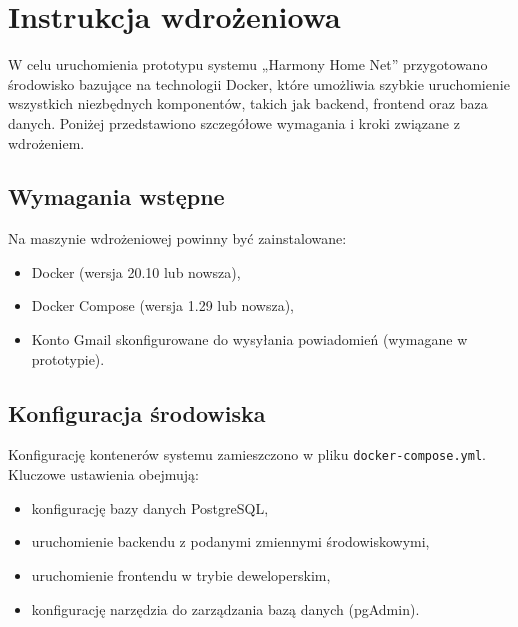 \chapter{Instrukcja wdrożeniowa}

W celu uruchomienia prototypu systemu „Harmony Home Net” przygotowano środowisko bazujące na technologii Docker, które umożliwia szybkie uruchomienie wszystkich niezbędnych komponentów, takich jak backend, frontend oraz baza danych. Poniżej przedstawiono szczegółowe wymagania i kroki związane z wdrożeniem.

\section{Wymagania wstępne}
Na maszynie wdrożeniowej powinny być zainstalowane:
\begin{itemize}
    \item Docker (wersja 20.10 lub nowsza),
    \item Docker Compose (wersja 1.29 lub nowsza),
    \item Konto Gmail skonfigurowane do wysyłania powiadomień (wymagane w prototypie).
\end{itemize}

\section{Konfiguracja środowiska}
Konfigurację kontenerów systemu zamieszczono w pliku \texttt{docker-compose.yml}. Kluczowe ustawienia obejmują:
\begin{itemize}
    \item konfigurację bazy danych PostgreSQL,
    \item uruchomienie backendu z podanymi zmiennymi środowiskowymi,
    \item uruchomienie frontendu w trybie deweloperskim,
    \item konfigurację narzędzia do zarządzania bazą danych (pgAdmin).
\end{itemize}

